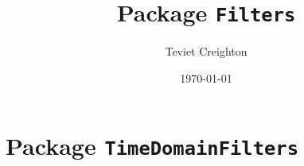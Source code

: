 \documentclass{article}
\begin{document}
\title{Package \texttt{Filters}}
\author{Teviet Creighton}
\date{\today}
\maketitle

\chapter{Package \texttt{TimeDomainFilters}}



\end{document}
